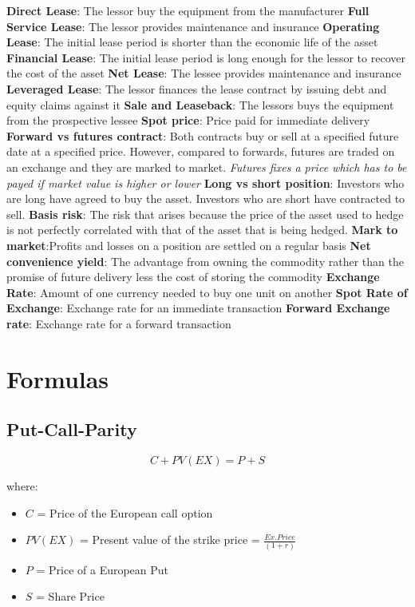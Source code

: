 \documentclass{cheatsheet}
\begin{document}
    \textbf{Direct Lease}: The lessor buy the equipment from the manufacturer
    \textbf{Full Service Lease}: The lessor provides maintenance and insurance
    \textbf{Operating Lease}: The initial lease period is shorter than the economic life of the asset
    \textbf{Financial Lease}: The initial lease period is long enough for the lessor to recover the cost of the asset
    \textbf{Net Lease}: The lessee provides maintenance and insurance
    \textbf{Leveraged Lease}: The lessor finances the lease contract by issuing debt and equity claims against it
    \textbf{Sale and Leaseback}: The lessors buys the equipment from the prospective lessee
    \textbf{Spot price}: Price paid for immediate delivery
    \textbf{Forward vs futures contract}: Both contracts buy or sell at a specified future date at a specified price. However, compared to forwards, futures are traded on an exchange and they are marked to market. \textit{Futures fixes a price which has to be payed if market value is higher or lower}
    \textbf{Long vs short position}: Investors who are long have agreed to buy the asset. Investors who are short have contracted to sell.
    \textbf{Basis risk}: The risk that arises because the price of the asset used to hedge is not perfectly correlated with that of the asset that is being hedged.
    \textbf{Mark to market}:Profits and losses on a position are settled on a regular basis
    \textbf{Net convenience yield}: The advantage from owning the commodity rather than the promise of future delivery less the cost of storing the commodity
    \textbf{Exchange Rate}: Amount of one currency needed to buy one unit on another
    \textbf{Spot Rate of Exchange}: Exchange rate for an immediate transaction
    \textbf{Forward Exchange rate}: Exchange rate for a forward transaction

\section*{Formulas}
\subsection{Put-Call-Parity}
    \[
C + PV(EX) = P + S
\]

\noindent where:
\begin{itemize}
  \item $C$ = Price of the European call option
  \item $PV(EX)$ = Present value of the strike price = $\frac{Ex.Price}{(1+r)}$
  \item $P$ = Price of a European Put
  \item $S$ = Share Price
\end{itemize}
\end{document}
